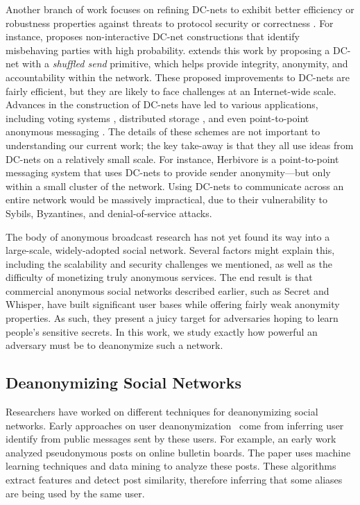 \documentclass[10pt, twocolumn]{article}
\begin{document}
Another branch of work focuses on refining DC-nets to exhibit better efficiency or robustness properties against threats to protocol security or correctness \cite{waidner1989dining,golle2004dining,corrigan2010dissent}.
For instance, \cite{golle2004dining} proposes non-interactive DC-net constructions that identify misbehaving parties with high probability.
\cite{corrigan2010dissent} extends this work by proposing a DC-net with a \emph{shuffled send} primitive, which helps provide integrity, anonymity, and accountability within the network.
These proposed improvements to DC-nets are fairly efficient, but they are likely to face challenges at an Internet-wide scale.
Advances in the construction of DC-nets have led to various applications, including voting systems \cite{fujioka1993practical,van2010anonymous}, distributed storage \cite{freeHavenProject}, and even point-to-point anonymous messaging \cite{goel2003herbivore}.
The details of these schemes are not important to understanding our current work; the key take-away is that they all use ideas from DC-nets on a relatively small scale.
For instance, Herbivore \cite{goel2003herbivore} is a point-to-point messaging system that uses DC-nets to provide sender anonymity---but only within a small cluster of the network.
Using DC-nets to communicate across an entire network would be massively impractical, due to their vulnerability to Sybils, Byzantines, and denial-of-service attacks.

The body of anonymous broadcast research has not yet found its way into a large-scale, widely-adopted social network. 
Several factors might explain this, including the scalability and security challenges we mentioned, as well as the difficulty of monetizing truly anonymous services.
The end result is that commercial anonymous social networks described earlier, such as Secret and Whisper, have built significant user bases while offering fairly weak anonymity properties.
As such, they present a juicy target for adversaries hoping to learn people's sensitive secrets.
In this work, we study exactly how powerful an adversary must be to deanonymize such a network.

\subsection{Deanonymizing Social Networks}

Researchers have worked on different techniques for deanonymizing social networks. Early approaches on user deanonymization~\cite{novak2004anti,narayanan2006break} come from inferring user identify from public messages sent by these users. For example, an early work~\cite{novak2004anti} analyzed pseudonymous posts on online bulletin boards. The paper uses machine learning techniques and data mining to analyze these posts. These algorithms extract features and detect post similarity, therefore inferring that some aliases are being used by the same user. 
\end{document}
